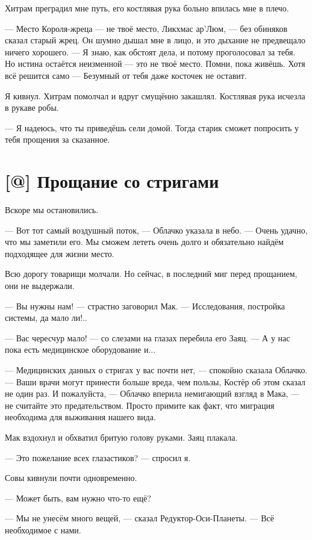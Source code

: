 Хитрам преградил мне путь, его костлявая рука больно впилась мне в плечо.

--- Место Короля-жреца --- не твоё место, Ликхмас ар’Люм, --- без обиняков сказал старый жрец.
Он шумно дышал мне в лицо, и это дыхание не предвещало ничего хорошего.
--- Я знаю, как обстоят дела, и потому проголосовал за тебя.
Но истина остаётся неизменной --- это не твоё место.
Помни, пока живёшь.
Хотя всё решится само --- Безумный от тебя даже косточек не оставит.

Я кивнул.
Хитрам помолчал и вдруг смущённо закашлял.
Костлявая рука исчезла в рукаве робы.

--- Я надеюсь, что ты приведёшь сели домой.
Тогда старик сможет попросить у тебя прощения за сказанное.

\section{[@] Прощание со стригами}

\textspace

Вскоре мы остановились.

--- Вот тот самый воздушный поток, --- Облачко указала в небо.
--- Очень удачно, что мы заметили его.
Мы сможем лететь очень долго и обязательно найдём подходящее для жизни место.

Всю дорогу товарищи молчали.
Но сейчас, в последний миг перед прощанием, они не выдержали.

--- Вы нужны нам! --- страстно заговорил Мак.
--- Исследования, постройка системы, да мало ли!..

--- Вас чересчур мало! --- со слезами на глазах перебила его Заяц.
--- А у нас пока есть медицинское оборудование и...

--- Медицинских данных о стригах у вас почти нет, --- спокойно сказала Облачко.
--- Ваши врачи могут принести больше вреда, чем пользы, Костёр об этом сказал не один раз.
И пожалуйста, --- Облачко вперила немигающий взгляд в Мака, --- не считайте это предательством.
Просто примите как факт, что миграция необходима для выживания нашего вида.

Мак вздохнул и обхватил бритую голову руками.
Заяц плакала.

--- Это пожелание всех глазастиков? --- спросил я.

Совы кивнули почти одновременно.

--- Может быть, вам нужно что-то ещё?

--- Мы не унесём много вещей, --- сказал Редуктор-Оси-Планеты.
--- Всё необходимое с нами.

